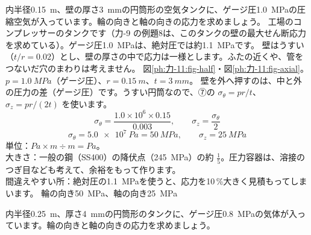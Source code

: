 \begin{phreidai}[空気タンクの壁の応力]
\label{ph:力-11:ex9}内半径\qty{0.15}{m}、壁の厚さ\qty{3}{mm}の円筒形の空気タンクに、ゲージ圧\qty{1.0}{MPa}の圧縮空気が入っています。輪の向きと軸の向きの応力を求めましょう。
\phbamen
工場のコンプレッサーのタンクです（力-9 の例題8は、このタンクの壁の最大せん断応力を求めている）。ゲージ圧\qty{1.0}{MPa}は、絶対圧では約\qty{1.1}{MPa}です。
\phmushi
壁はうすい（$t/r=0.02$）とし、壁の厚さの中で応力は一様とします。ふたの近くや、管をつないだ穴のまわりは考えません。
\phzu
図\ref{ph:力-11:fig-half}・図\ref{ph:力-11:fig-axial}。$p=\qty{1.0}{MPa}$（ゲージ圧）、$r=\qty{0.15}{m}$、$t=\qty{3}{mm}$。
\phriyu
壁を外へ押すのは、中と外の圧力の差（ゲージ圧）です。うすい円筒なので、⑦の $\sigma_\theta=pr/t$、$\sigma_z=pr/(2t)$ を使います。
\phtateru
\[ \sigma_\theta=\frac{1.0\times10^6\times0.15}{0.003},\qquad \sigma_z=\frac{\sigma_\theta}{2} \]
\phtoku
\[ \sigma_\theta=\qty{5.0e7}{Pa}=\qty{50}{MPa},\qquad \sigma_z=\qty{25}{MPa} \]
\phtashikame
単位：$\unit{Pa}\times\unit{m}\div\unit{m}=\unit{Pa}$。\\
大きさ：一般の鋼（SS400）の降伏点（\qty{245}{MPa}）の約 $\tfrac{1}{5}$。圧力容器は、溶接のつぎ目なども考えて、余裕をもって作ります。\\
間違えやすい所：絶対圧の\qty{1.1}{MPa}を使うと、応力を10\,\%大きく見積もってしまいます。
\kotae 輪の向き\qty{50}{MPa}、軸の向き\qty{25}{MPa}
\end{phreidai}
\begin{jibun}
内半径\qty{0.25}{m}、厚さ\qty{4}{mm}の円筒形のタンクに、ゲージ圧\qty{0.8}{MPa}の気体が入っています。輪の向きと軸の向きの応力を求めましょう。
\end{jibun}

